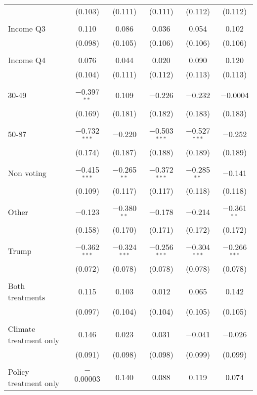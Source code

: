 \begin{tabular}{@{\extracolsep{5pt}}lccccc}
  & (0.103) & (0.111) & (0.111) & (0.112) & (0.112) \\ 
  & & & & & \\ 
 Income Q3 & 0.110 & 0.086 & 0.036 & 0.054 & 0.102 \\ 
  & (0.098) & (0.105) & (0.106) & (0.106) & (0.106) \\ 
  & & & & & \\ 
 Income Q4 & 0.076 & 0.044 & 0.020 & 0.090 & 0.120 \\ 
  & (0.104) & (0.111) & (0.112) & (0.113) & (0.113) \\ 
  & & & & & \\ 
 30-49 & $-$0.397$^{**}$ & 0.109 & $-$0.226 & $-$0.232 & $-$0.0004 \\ 
  & (0.169) & (0.181) & (0.182) & (0.183) & (0.183) \\ 
  & & & & & \\ 
 50-87 & $-$0.732$^{***}$ & $-$0.220 & $-$0.503$^{***}$ & $-$0.527$^{***}$ & $-$0.252 \\ 
  & (0.174) & (0.187) & (0.188) & (0.189) & (0.189) \\ 
  & & & & & \\ 
 Non voting & $-$0.415$^{***}$ & $-$0.265$^{**}$ & $-$0.372$^{***}$ & $-$0.285$^{**}$ & $-$0.141 \\ 
  & (0.109) & (0.117) & (0.117) & (0.118) & (0.118) \\ 
  & & & & & \\ 
 Other & $-$0.123 & $-$0.380$^{**}$ & $-$0.178 & $-$0.214 & $-$0.361$^{**}$ \\ 
  & (0.158) & (0.170) & (0.171) & (0.172) & (0.172) \\ 
  & & & & & \\ 
 Trump & $-$0.362$^{***}$ & $-$0.324$^{***}$ & $-$0.256$^{***}$ & $-$0.304$^{***}$ & $-$0.266$^{***}$ \\ 
  & (0.072) & (0.078) & (0.078) & (0.078) & (0.078) \\ 
  & & & & & \\ 
 Both treatments & 0.115 & 0.103 & 0.012 & 0.065 & 0.142 \\ 
  & (0.097) & (0.104) & (0.104) & (0.105) & (0.105) \\ 
  & & & & & \\ 
 Climate treatment only & 0.146 & 0.023 & 0.031 & $-$0.041 & $-$0.026 \\ 
  & (0.091) & (0.098) & (0.098) & (0.099) & (0.099) \\ 
  & & & & & \\ 
 Policy treatment only & $-$0.00003 & 0.140 & 0.088 & 0.119 & 0.074 \\ 

\end{tabular}
